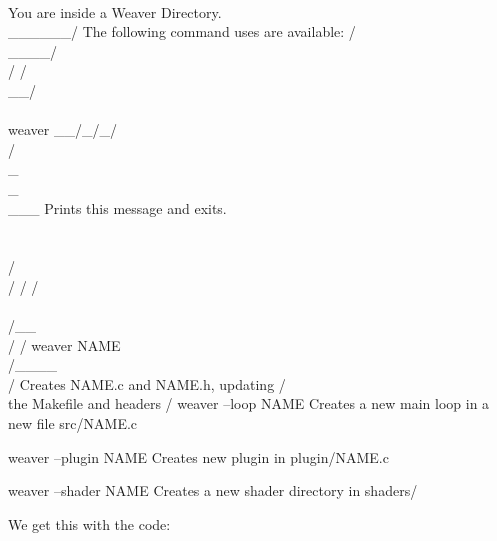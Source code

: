 {\alinhaverbatim
       \\              You are inside a Weaver Directory.
        \\______/      The following command uses are available:
        /\\____/\\
       / /\\__/\\ \\       weaver
    __/_/_/\\/\\_\\_\\___     Prints this message and exits.
      \\ \\ \\/\\/ / /
       \\ \\/__\\/ /       weaver NAME
        \\/____\\/          Creates NAME.c and NAME.h, updating
        /      \\          the Makefile and headers
       /
                          weaver --loop NAME
                           Creates a new main loop in a new file src/NAME.c

                          weaver --plugin NAME
                           Creates new plugin in plugin/NAME.c

                          weaver --shader NAME
                           Creates a new shader directory in shaders/
\alinhanormal

We get this with the code:

}
